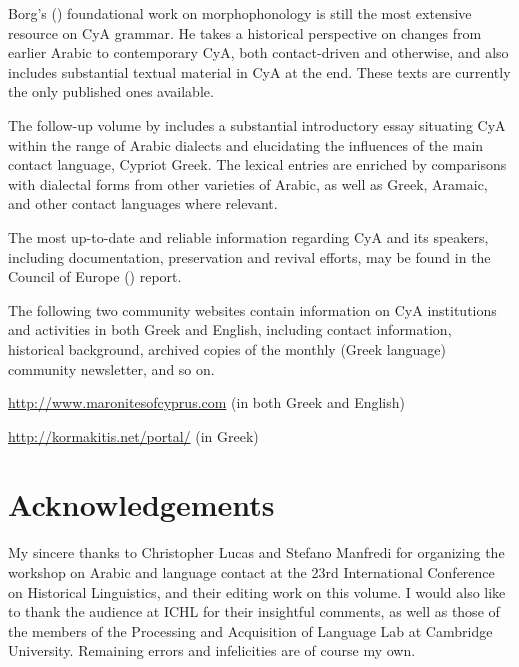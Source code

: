 \documentclass[output=paper]{langsci/langscibook}
\begin{document}
Borg's (\citeyear{Borg1985}) foundational work on morphophonology is still the most extensive resource on CyA grammar. He takes a historical perspective on changes from earlier Arabic to contemporary CyA, both contact-driven and otherwise, and also includes substantial textual material in CyA at the end. These texts are currently the only published ones available. 

The follow-up volume by \citet{Borg2004} includes a substantial introductory essay situating CyA within the range of Arabic dialects and elucidating the influences of the main contact language, Cypriot Greek. The lexical entries are enriched by comparisons with dialectal forms from other varieties of Arabic, as well as Greek, Aramaic, and other contact languages where relevant.  

The most up-to-date and reliable information regarding CyA and its speakers, including documentation, preservation and revival efforts, may be found in the Council of Europe (\citeyear{CouncilofEurope2017}) report. 

The following two community websites contain information on CyA institutions and activities in both Greek and English, including contact information, historical background, archived copies of the monthly (Greek language) community newsletter, and so on.

\url{http://www.maronitesofcyprus.com} (in both Greek and English)

\url{http://kormakitis.net/portal/} (in Greek)


 

\section*{Acknowledgements}
My sincere thanks to Christopher Lucas and Stefano Manfredi for organizing the workshop on Arabic and language contact at the 23rd International Conference on Historical Linguistics, and their editing work on this volume. I would also like to thank the audience at ICHL for their insightful comments, as well as those of the members of the Processing and Acquisition of Language Lab at Cambridge University. Remaining errors and infelicities are of course my own. 
\end{document}
